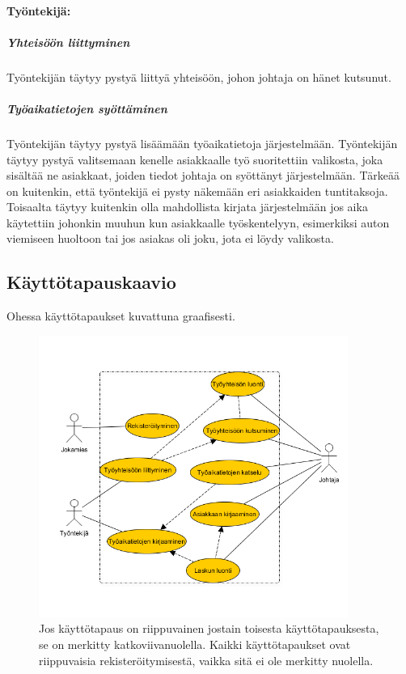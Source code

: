 \documentclass[a4paper, 12pt finnish]{article}
\begin{document}
\paragraph{Työntekijä:}
\subparagraph{Yhteisöön liittyminen} Työntekijän täytyy pystyä liittyä
yhteisöön, johon johtaja on hänet kutsunut.
\subparagraph{Työaikatietojen syöttäminen} Työntekijän täytyy pystyä
lisäämään työaikatietoja järjestelmään. Työntekijän täytyy pystyä
valitsemaan kenelle asiakkaalle työ suoritettiin valikosta, joka sisältää
ne asiakkaat, joiden tiedot johtaja on syöttänyt järjestelmään. Tärkeää
on kuitenkin, että työntekijä ei pysty näkemään eri asiakkaiden
tuntitaksoja. Toisaalta täytyy kuitenkin olla mahdollista kirjata
järjestelmään jos aika käytettiin johonkin muuhun kun asiakkaalle
työskentelyyn, esimerkiksi auton viemiseen huoltoon tai jos asiakas oli
joku, jota ei löydy valikosta.

\subsection{Käyttötapauskaavio} Ohessa käyttötapaukset kuvattuna
graafisesti.

\begin{figure}[h]
    \centering
    \includegraphics[width=0.9\textwidth]{graafi.png}
    \caption{\small Jos käyttötapaus on riippuvainen jostain toisesta
    käyttötapauksesta, se on merkitty katkoviivanuolella. Kaikki
käyttötapaukset ovat riippuvaisia rekisteröitymisestä, vaikka sitä
ei ole merkitty nuolella.}
\end{figure}
\end{document}

